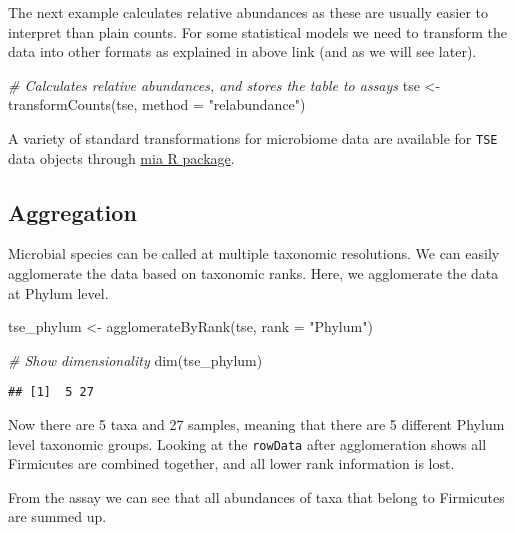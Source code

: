 \documentclass[
  oneside]{book}
\newenvironment{Shaded}{\begin{snugshade}}{\end{snugshade}}
\newcommand{\AttributeTok}[1]{\textcolor[rgb]{0.77,0.63,0.00}{#1}}
\newcommand{\CommentTok}[1]{\textcolor[rgb]{0.56,0.35,0.01}{\textit{#1}}}
\newcommand{\FunctionTok}[1]{\textcolor[rgb]{0.00,0.00,0.00}{#1}}
\newcommand{\NormalTok}[1]{#1}
\newcommand{\OtherTok}[1]{\textcolor[rgb]{0.56,0.35,0.01}{#1}}
\newcommand{\StringTok}[1]{\textcolor[rgb]{0.31,0.60,0.02}{#1}}
\begin{document}
The next example calculates relative abundances as these are usually easier to
interpret than plain counts. For some statistical models we need to
transform the data into other formats as explained in above link (and
as we will see later).

\begin{Shaded}
\begin{Highlighting}[]
\CommentTok{\# Calculates relative abundances, and stores the table to assays}
\NormalTok{tse }\OtherTok{\textless{}{-}} \FunctionTok{transformCounts}\NormalTok{(tse, }\AttributeTok{method =} \StringTok{"relabundance"}\NormalTok{)}
\end{Highlighting}
\end{Shaded}

A variety of standard transformations for microbiome data are available for \texttt{TSE} data objects through \href{https://microbiome.github.io/mia/reference/transformCounts.html}{mia R package}.

\hypertarget{aggregation}{%
\subsection{Aggregation}\label{aggregation}}

Microbial species can be called at multiple taxonomic resolutions. We
can easily agglomerate the data based on taxonomic ranks. Here, we
agglomerate the data at Phylum level.

\begin{Shaded}
\begin{Highlighting}[]
\NormalTok{tse\_phylum }\OtherTok{\textless{}{-}} \FunctionTok{agglomerateByRank}\NormalTok{(tse, }\AttributeTok{rank =} \StringTok{"Phylum"}\NormalTok{)}

\CommentTok{\# Show dimensionality}
\FunctionTok{dim}\NormalTok{(tse\_phylum)}
\end{Highlighting}
\end{Shaded}

\begin{verbatim}
## [1]  5 27
\end{verbatim}

Now there are 5 taxa and 27
samples, meaning that there are 5 different
Phylum level taxonomic groups. Looking at the \texttt{rowData} after
agglomeration shows all Firmicutes are combined together, and all
lower rank information is lost.

From the assay we can see that all abundances of taxa that belong to
Firmicutes are summed up.
\end{document}
